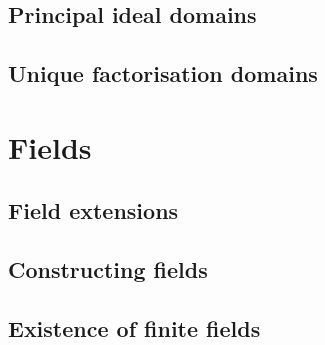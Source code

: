 \documentclass[../Year2.tex]{subfiles}
\begin{document}
\subsection{Principal ideal domains}

\subsection{Unique factorisation domains}

\section{Fields}

\subsection{Field extensions}

\subsection{Constructing fields}

\subsection{Existence of finite fields}
\end{document}

